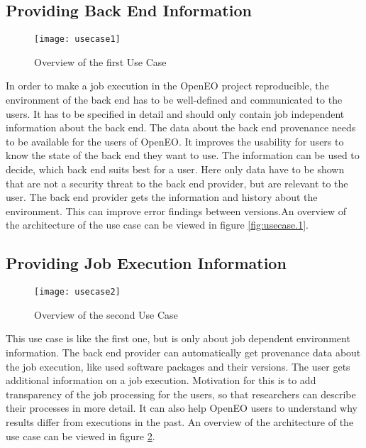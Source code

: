 \documentclass[draft,final]{vutinfth} %
\begin{document}
\subsection{Providing Back End Information}\label{UseCase1}
\begin{figure}[h]
	\centering
	\texttt{[image: usecase1]}
	\caption{Overview of the first Use Case}
	\label{fig:usecase1} %
\end{figure}
In order to make a job execution in the OpenEO project reproducible, the environment of the back end has to be well-defined and communicated to the users. It has to be specified in detail and should only contain job independent information about the back end. The data about the back end provenance needs to be available for the users of OpenEO. It improves the usability for users to know the state of the back end they want to use. The information can be used to decide, which back end suits best for a user. Here only data have to be shown that are not a security threat to the back end provider, but are relevant to the user. The back end provider gets the information and history about the environment. This can improve error findings between versions.An overview of the architecture of the use case can be viewed in figure \ref{fig:usecase.1}.

\subsection{Providing Job Execution Information}\label{UseCase2}
\begin{figure}[h]
	\centering
	\texttt{[image: usecase2]}
	\caption{Overview of the second Use Case}
	\label{fig:usecase2} %
\end{figure}
This use case is like the first one, but is only about job dependent environment information. The back end provider can automatically get provenance data about the job execution, like used software packages and their versions. The user gets additional information on a job execution. Motivation for this is to add transparency of the job processing for the users, so that researchers can describe their processes in more detail. It can also help OpenEO users to understand why results differ from executions in the past. An overview of the architecture of the use case can be viewed in figure \ref{fig:usecase2}. 
\end{document}
